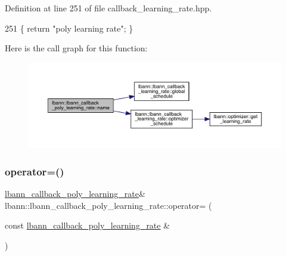 Definition at line 251 of file callback\+\_\+learning\+\_\+rate.\+hpp.


\begin{DoxyCode}
251 \{ \textcolor{keywordflow}{return} \textcolor{stringliteral}{"poly learning rate"}; \}
\end{DoxyCode}
Here is the call graph for this function\+:\nopagebreak
\begin{figure}[H]
\begin{center}
\leavevmode
\includegraphics[width=350pt]{classlbann_1_1lbann__callback__poly__learning__rate_a755be6dc66e1c403edc69db11592a4ea_cgraph}
\end{center}
\end{figure}
\mbox{\label{classlbann_1_1lbann__callback__poly__learning__rate_a5e93001766ab49b38d0cc387362970e3}} 
\subsubsection{\texorpdfstring{operator=()}{operator=()}}
{\footnotesize\ttfamily \hyperlink{classlbann_1_1lbann__callback__poly__learning__rate}{lbann\+\_\+callback\+\_\+poly\+\_\+learning\+\_\+rate}\& lbann\+::lbann\+\_\+callback\+\_\+poly\+\_\+learning\+\_\+rate\+::operator= (\begin{DoxyParamCaption}\item[{const \hyperlink{classlbann_1_1lbann__callback__poly__learning__rate}{lbann\+\_\+callback\+\_\+poly\+\_\+learning\+\_\+rate} \&}]{ }\end{DoxyParamCaption})\hspace{0.3cm}{\ttfamily [default]}}

\mbox{\label{classlbann_1_1lbann__callback__poly__learning__rate_a55414af733e519be126572ec92492bf7}} 
